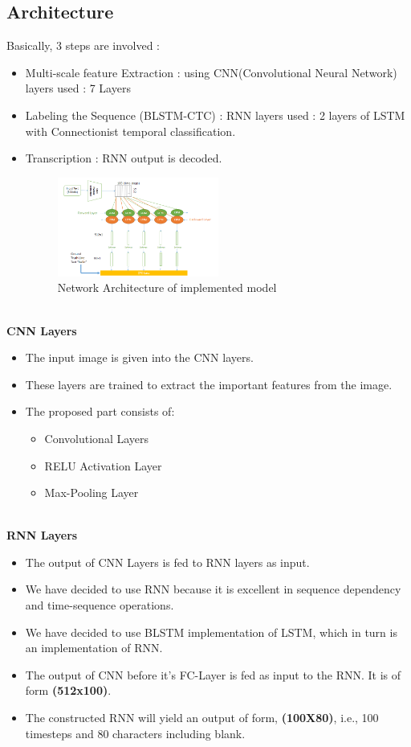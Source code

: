 \documentclass[12pt, conference]{IEEEtran}
\begin{document}
\subsection{\textbf{Architecture}}
Basically, 3 steps are involved :
\begin{itemize}
    \item Multi-scale feature Extraction : using  CNN(Convolutional Neural Network) layers used : 7 Layers
    \item Labeling the Sequence (BLSTM-CTC) : RNN layers used : 2 layers of LSTM with Connectionist temporal classification.
    \item Transcription : RNN output is decoded.
    \begin{figure}[h]
        \centering
        \includegraphics[width=0.5\textwidth]{img2.jpg}
        \caption{Network Architecture of implemented model}
    \end{figure}
\end{itemize}
\textbf{\\}
\textbf{CNN Layers}
\begin{itemize}
    \item The input image is given into the CNN layers.
    \item These layers are trained to extract the important features from the image.
    \item The proposed part consists of:
    \begin{itemize}
        \item Convolutional Layers
        \item RELU Activation Layer
        \item Max-Pooling Layer
    \end{itemize}
\end{itemize}
\textbf{}\\
\textbf{RNN Layers}
\begin{itemize}
    \item The output of CNN Layers is fed to RNN layers as input.
    \item We have decided to use RNN because it is excellent in sequence dependency and time-sequence operations.
    \item We have decided to use BLSTM implementation of LSTM, which in turn is an implementation of RNN.
    \item The output of CNN before it's FC-Layer is fed as input to the RNN. It is of form \textbf{(512x100)}.
    \item The constructed RNN will yield an output of form, \textbf{(100X80)}, i.e., 100 timesteps and 80 characters including blank.
\end{itemize}
\end{document}
